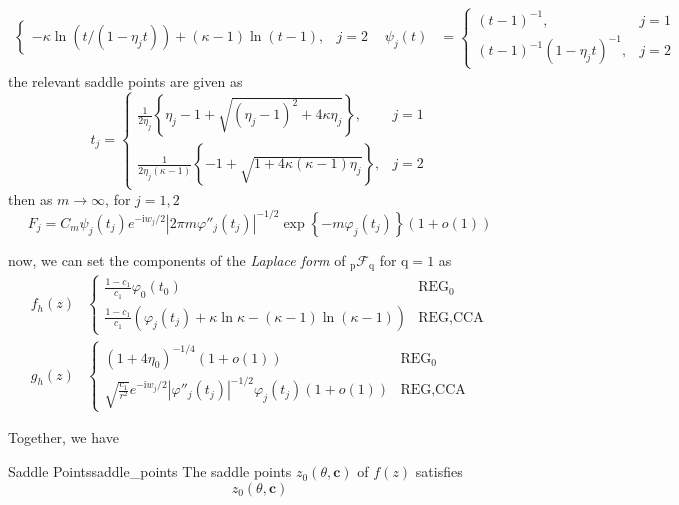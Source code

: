 \documentclass[twoside]{article}
\begin{document}
\begin{itemize}
\begin{itemize}
\begin{itemize}
\begin{align*}
\begin{cases}
                    -\kappa \ln(t/(1-\eta_jt))+(\kappa-1)\ln(t-1), &j=2
                \end{cases} & \psi_j(t) &=\begin{cases}
                    (t-1)^{-1},&j=1\\
                    (t-1)^{-1}(1-\eta_jt)^{-1}, &j=2
                \end{cases}
            \end{align*}
            the relevant saddle points are given as
            \begin{equation*}
                t_j = \begin{cases}
                    \frac{1}{2\eta_j}\left\{ \eta_j-1 + \sqrt{(\eta_j-1)^2+4\kappa\eta_j} \right\}, &j=1\\
                    \frac{1}{2\eta_j(\kappa-1)}\left\{ -1 + \sqrt{1+4\kappa(\kappa-1)\eta_j} \right\}, &j=2
                \end{cases}
            \end{equation*}
            then as $m\rightarrow \infty$, for $j=1,2$
            $$
            F_j = C_m \psi_j(t_j)e^{-\mathrm{i}w_j/2}\left\vert 2\pi m\varphi''_j(t_j) \right\vert^{-1/2}\exp\left\{-m\varphi_j(t_j)\right\} (1+o(1))
            $$
        \end{itemize}
        now, we can set the components of the \textit{Laplace form} of $_{\mathrm{p}}\mathcal{F}_{\mathrm{q}}$ for $\mathrm{q}=1$ as
        \begin{align}
            f_{h}(z) & \begin{cases}
                \frac{1-c_1}{c_1}\varphi_0(t_0) & \text{REG}_0\\
                \frac{1-c_1}{c_1}\left(\varphi_j(t_j)+\kappa\ln\kappa - (\kappa-1)\ln(\kappa-1)\right) & \text{REG,CCA}
            \end{cases}\\
            g_h(z) & \begin{cases}
                (1+4\eta_0)^{-1/4}(1+o(1)) & \text{REG}_0\\
                \sqrt{\frac{c_1}{r^2}}e^{-\mathrm{i}w_j/2}\left\vert \varphi''_{j}(t_j) \right\vert^{-1/2} \varphi_j(t_j)(1+o(1)) & \text{REG,CCA}
            \end{cases}
        \end{align}
    \end{itemize}
\end{itemize}

Together, we have 
\begin{lemma}{Saddle Points}{saddle_points}
    The saddle points $z_0(\theta,\mathbf{c})$ of $f(z)$ satisfies
    \begin{equation}
        z_0(\theta,\mathbf{c})
    \end{equation}
\end{lemma}

\newpage


\end{document}
